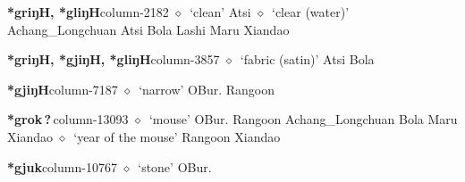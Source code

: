   \item {\footnotesize \textbf{*griŋH, *gliŋH}}{\tiny column-2182}
         $\diamond$~`clean'
         Atsi 
\hspace{1ex}
         $\diamond$~`clear (water)'
         Achang\_Longchuan 
\hspace{1ex}
         Atsi 
\hspace{1ex}
         Bola 
\hspace{1ex}
         Lashi 
\hspace{1ex}
         Maru 
\hspace{1ex}
         Xiandao 
  \item {\footnotesize \textbf{*griŋH, *gjiŋH, *gliŋH}}{\tiny column-3857}
         $\diamond$~`fabric (satin)'
         Atsi 
\hspace{1ex}
         Bola 
  \item {\footnotesize \textbf{*gjiŋH}}{\tiny column-7187}
         $\diamond$~`narrow'
         OBur. 
\hspace{1ex}
         Rangoon 
  \item {\footnotesize \textbf{*grok\,?\,}}{\tiny column-13093}
         $\diamond$~`mouse'
         OBur. 
\hspace{1ex}
         Rangoon 
\hspace{1ex}
         Achang\_Longchuan 
\hspace{1ex}
         Bola 
\hspace{1ex}
         Maru 
\hspace{1ex}
         Xiandao 
\hspace{1ex}
         $\diamond$~`year of the mouse'
         Rangoon 
\hspace{1ex}
         Xiandao 
  \item {\footnotesize \textbf{*gjuk}}{\tiny column-10767}
         $\diamond$~`stone'
         OBur. 
\hspace{1ex}
